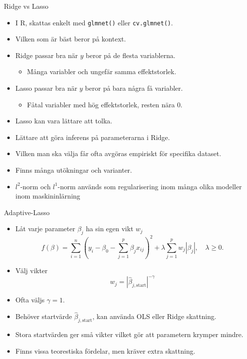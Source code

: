 \documentclass[10pt,english]{beamer}
\begin{document}
\begin{frame}{Ridge vs Lasso}
    
    \begin{itemize}
        \item I R, skattas enkelt med \texttt{glmnet()} eller \texttt{cv.glmnet()}.
        \item Vilken som är bäst beror på kontext.
        \item Ridge passar bra när $y$ beror på de flesta variablerna.
        \begin{itemize}
            \item Många variabler och ungefär samma effektstorlek.
        \end{itemize}
        \item Lasso passar bra när $y$ beror på bara några få variabler.
        \begin{itemize}
            \item Fåtal variabler med hög effektstorlek, resten nära 0.
        \end{itemize}
        \item Lasso kan vara lättare att tolka.
        \item Lättare att göra inferens på parameterarna i Ridge.
        \item Vilken man ska välja får ofta avgöras empiriskt för specifika dataset.
        \item Finns många utökningar och varianter.
        \item $l^2$-norm och $l^1$-norm används som regularisering inom många olika modeller inom maskininlärning
    \end{itemize}

\end{frame}

\begin{frame}{Adaptive-Lasso}
    \begin{itemize}
        \item Låt varje parameter $\beta_j$ ha sin egen vikt $w_j$
        \begin{equation*}
            f(\beta) = \sum_{i=1}^{n}\left(y_i - \beta_0 - \sum_{j=1}^{p}\beta_j x_{ij}\right)^2 + \lambda \sum_{j=1}^{p} w_j |\beta_j|, \quad \lambda \geq 0.
        \end{equation*}
        \item Välj vikter
        \begin{equation*}
            w_j = | \hat{\beta}_{j, \text{start}} |^{-\gamma}
        \end{equation*}
        \item Ofta väljs $\gamma = 1$.
        \item Behöver startvärde $\hat{\beta}_{j,\text{start}}$, kan använda OLS eller Ridge skattning.
        \item Stora startvärden ger små vikter vilket gör att parametern krymper mindre.
        \item Finns vissa teorestiska fördelar, men kräver extra skattning.
    \end{itemize}
\end{frame}
\end{document}
